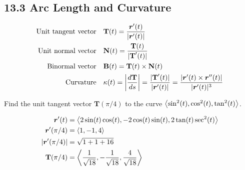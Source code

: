 \documentclass[12pt]{exam}
\newcommand{\bT}{\text{\textbf{T}}}
\newcommand{\bN}{\text{\textbf{N}}}
\newcommand{\bB}{\text{\textbf{B}}}
\newcommand{\LR}[1]{\left(#1\right)}
\begin{document}
\begin{questions}


\newpage

\section*{13.3 Arc Length and Curvature}

\begin{align*}
    \text{Unit tangent vector}\quad & \bT(t) = \dfrac{\br'(t)}{|\br'(t)|} \\
                \text{Unit normal vector}\quad & \bN(t) = \dfrac{\bT(t)}{|\bT'(t)|} \\
                \text{Binormal vector}\quad & \bB(t) = \bT(t)\times \bN(t)\\
                \text{Curvature}\quad & \kappa(t)=\left|\dfrac{d\bT}{ds}\right| = \dfrac{|\bT'(t)|}{|\br'(t)|} = \dfrac{|\br'(t)\times \br''(t)|}{|\br'(t)|^3}
\end{align*}

\question Find the unit tangent vector \(\bm{T}(\pi/4)\) to the curve \(\left\langle \sin^2(t),\cos^2(t),\tan^2(t) \right\rangle\).
    
\ifprintanswers
        \begin{solution}
            \begin{align*}
                \br'(t) & = \gen{2\sin(t)\cos(t),-2\cos(t)\sin(t),2\tan(t)\sec^2(t)}\\
                \br'(\pi/4) & = \gen{1,-1,4}\\
                |\br'(\pi/4)| & = \sqrt{1+1+16}\\
                \bT(\pi/4) & = \gen{\frac{1}{\sqrt{18}},-\frac{1}{\sqrt{18}},\frac{4}{\sqrt{18}}}
            \end{align*}
        \end{solution}
    \else
        \vfill
    \fi



\end{questions}
\end{document}
